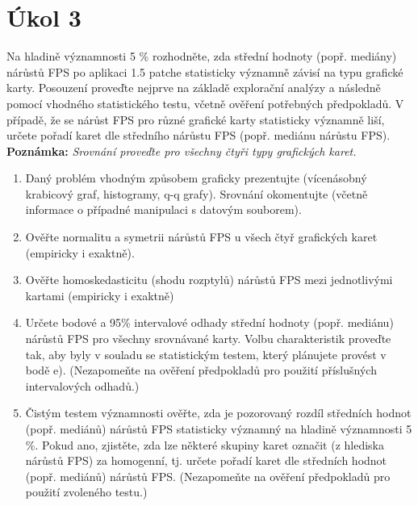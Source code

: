 \section*{Úkol 3}
\label{sec:task-3}

Na hladině významnosti 5 \% rozhodněte, zda střední hodnoty (popř. mediány) nárůstů FPS po aplikaci 1.5 patche statisticky významně závisí na typu 
grafické karty. Posouzení proveďte nejprve na základě explorační analýzy a následně pomocí vhodného statistického testu, včetně ověření potřebných 
předpokladů. V případě, že se nárůst FPS pro různé grafické karty statisticky významně liší, určete pořadí karet dle středního nárůstu FPS (popř. mediánu nárůstu FPS). 
\textbf{Poznámka:} \textit{Srovnání proveďte pro všechny čtyři typy grafických karet.}

\begin{enumerate}[label=\alph*]
    \item Daný problém vhodným způsobem graficky prezentujte (vícenásobný krabicový graf, histogramy, q-q grafy). 
    Srovnání okomentujte (včetně informace o případné manipulaci s datovým souborem).
    
    \newpage
    \item Ověřte normalitu a symetrii nárůstů FPS u všech čtyř grafických karet (empiricky i exaktně).
    
    \newpage
    \item Ověřte homoskedasticitu (shodu rozptylů) nárůstů FPS mezi jednotlivými kartami (empiricky i exaktně)
    
    \newpage
    \item Určete bodové a 95\% intervalové odhady střední hodnoty (popř. mediánu) nárůstů FPS pro všechny srovnávané karty. 
    Volbu charakteristik proveďte tak, aby byly v souladu se statistickým testem, který plánujete provést v bodě e). 
    (Nezapomeňte na ověření předpokladů pro použití příslušných intervalových odhadů.)
    
    \newpage
    \item Čistým testem významnosti ověřte, zda je pozorovaný rozdíl středních hodnot (popř. mediánů) nárůstů FPS statisticky 
    významný na hladině významnosti 5 \%. Pokud ano, zjistěte, zda lze některé skupiny karet označit (z hlediska nárůstů FPS) 
    za homogenní, tj. určete pořadí karet dle středních hodnot (popř. mediánů) nárůstů FPS. 
    (Nezapomeňte na ověření předpokladů pro použití zvoleného testu.)
\end{enumerate}

\endinput